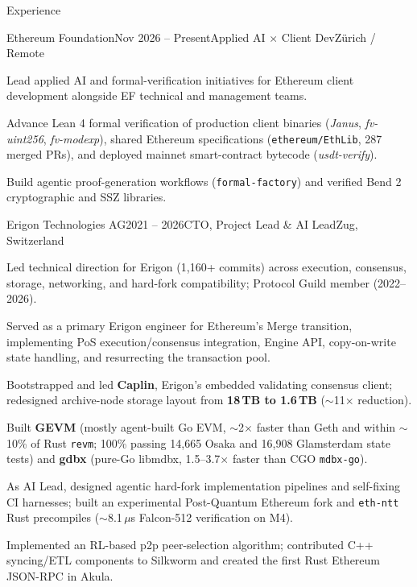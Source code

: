 \documentclass[10pt]{resume}
\begin{document}

\begin{rSection}{Experience}

	\begin{rSubsection}{Ethereum Foundation}{Nov 2026 -- Present}{Applied AI $\times$ Client Dev}{Z\"urich / Remote}
		\item Lead applied AI and formal-verification initiatives for Ethereum client development alongside EF technical and management teams.
		\item Advance Lean 4 formal verification of production client binaries (\textit{Janus}, \textit{fv-uint256}, \textit{fv-modexp}), shared Ethereum specifications (\texttt{ethereum/EthLib}, 287 merged PRs), and deployed mainnet smart-contract bytecode (\textit{usdt-verify}).
		\item Build agentic proof-generation workflows (\texttt{formal-factory}) and verified Bend 2 cryptographic and SSZ libraries.
	\end{rSubsection}

	\begin{rSubsection}{Erigon Technologies AG}{2021 -- 2026}{CTO, Project Lead \& AI Lead}{Zug, Switzerland}
		\item Led technical direction for Erigon (1,160+ commits) across execution, consensus, storage, networking, and hard-fork compatibility; Protocol Guild member (2022--2026).
		\item Served as a primary Erigon engineer for Ethereum's Merge transition, implementing PoS execution/consensus integration, Engine API, copy-on-write state handling, and resurrecting the transaction pool.
		\item Bootstrapped and led \textbf{Caplin}, Erigon's embedded validating consensus client; redesigned archive-node storage layout from \textbf{18\,TB to 1.6\,TB} ($\sim$11$\times$ reduction).
		\item Built \textbf{GEVM} (mostly agent-built Go EVM, $\sim$2$\times$ faster than Geth and within $\sim$10\% of Rust \texttt{revm}; 100\% passing 14,665 Osaka and 16,908 Glamsterdam state tests) and \textbf{gdbx} (pure-Go libmdbx, 1.5--3.7$\times$ faster than CGO \texttt{mdbx-go}).
		\item As AI Lead, designed agentic hard-fork implementation pipelines and self-fixing CI harnesses; built an experimental Post-Quantum Ethereum fork and \texttt{eth-ntt} Rust precompiles ($\sim$8.1\,$\mu$s Falcon-512 verification on M4).
		\item Implemented an RL-based p2p peer-selection algorithm; contributed C++ syncing/ETL components to Silkworm and created the first Rust Ethereum JSON-RPC in Akula.
	\end{rSubsection}


\end{rSection}
\end{document}
